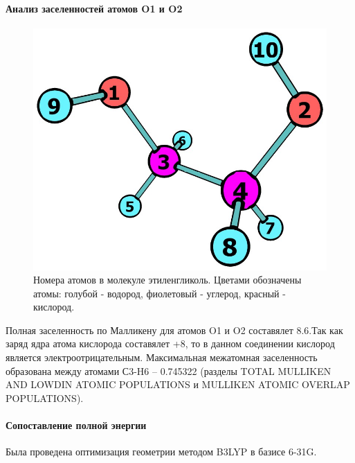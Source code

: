\paragraph*{Анализ заселенностей атомов O1 и O2}
\begin{figure}[H]
\centering
\captionsetup{justification=centering}
\includegraphics[scale=0.4]{fig/1.jpg}
\caption{Номера атомов в молекуле этиленгликоль. Цветами обозначены атомы: голубой - водород, фиолетовый - углерод, красный - кислород.}
\end{figure}

Полная заселенность по Малликену для атомов O1 и O2 составялет 8.6.Так как заряд ядра атома кислорода составялет +8, то в данном соединении кислород является электроотрицательным. Максимальная межатомная заселенность образована между атомами С3-H6 -- 0.745322 (разделы TOTAL MULLIKEN AND LOWDIN ATOMIC POPULATIONS и MULLIKEN ATOMIC OVERLAP POPULATIONS). 
\paragraph*{Сопоставление полной энергии}
Была проведена оптимизация геометрии методом B3LYP в базисе 6-31G.

